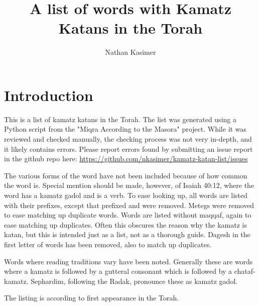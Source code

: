 	\title{A list of words with Kamatz Katans in the Torah}
	
	\author{Nathan Kasimer}
	
	\maketitle
	
	\section{Introduction}
	This is a list of kamatz katans in the Torah.  The list was generated using a Python script from the "Miqra According to the Masora" project.  While it was reviewed and checked manually, the checking process was not very in-depth, and it likely contains errors.  Please report errors found by submitting an issue report in the github repo here: \url{https://github.com/nkasimer/kamatz-katan-list/issues}
	
	The various forms of the word  have not been included because of how common the word is.  Special mention should be made, however, of Isaiah 40:12, where the word  has a kamatz gadol and is a verb.  To ease looking up, all words are listed with their prefixes, except that prefixed  and  were removed. Metegs were removed to ease matching up duplicate words.  Words are listed without maqqaf, again to ease matching up duplicates.  Often this obscures the reason why the kamatz is katan, but this is intended just as a list, not as a thorough guide.  Dagesh in the first letter of words has been removed, also to match up duplicates.
	
	Words where reading traditions vary have been noted.  Generally these are words where a kamatz is followed by a gutteral consonant which is followed by a chataf-kamatz.  Sephardim, following the Radak, pronounce these as kamatz gadol.
	
	The listing is according to first appearance in the Torah.